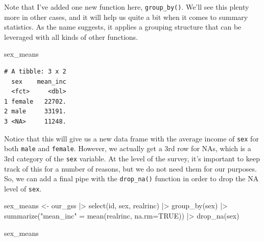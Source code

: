 \documentclass[
  letterpaper,
  DIV=11,
  numbers=noendperiod]{scrreprt}
\newenvironment{Shaded}{\begin{snugshade}}{\end{snugshade}}
\newcommand{\AttributeTok}[1]{\textcolor[rgb]{0.40,0.45,0.13}{#1}}
\newcommand{\ConstantTok}[1]{\textcolor[rgb]{0.56,0.35,0.01}{#1}}
\newcommand{\FunctionTok}[1]{\textcolor[rgb]{0.28,0.35,0.67}{#1}}
\newcommand{\NormalTok}[1]{\textcolor[rgb]{0.00,0.23,0.31}{#1}}
\newcommand{\OtherTok}[1]{\textcolor[rgb]{0.00,0.23,0.31}{#1}}
\newcommand{\SpecialCharTok}[1]{\textcolor[rgb]{0.37,0.37,0.37}{#1}}
\newcommand{\StringTok}[1]{\textcolor[rgb]{0.13,0.47,0.30}{#1}}
\begin{document}
\begin{tcolorbox}[enhanced jigsaw, toprule=.15mm, breakable, rightrule=.15mm, colback=white, colframe=quarto-callout-note-color-frame, colbacktitle=quarto-callout-note-color!10!white, titlerule=0mm, left=2mm, title=\textcolor{quarto-callout-note-color}{\faInfo}\hspace{0.5em}{Note}, bottomrule=.15mm, leftrule=.75mm, opacityback=0, bottomtitle=1mm, arc=.35mm, toptitle=1mm, coltitle=black, opacitybacktitle=0.6]

Note that I've added one new function here, \texttt{group\_by()}. We'll
see this plenty more in other cases, and it will help us quite a bit
when it comes to summary statistics. As the name suggests, it applies a
grouping structure that can be leveraged with all kinds of other
functions.

\end{tcolorbox}

\begin{Shaded}
\begin{Highlighting}[]
\NormalTok{sex\_means}
\end{Highlighting}
\end{Shaded}

\begin{verbatim}
# A tibble: 3 x 2
  sex    mean_inc
  <fct>     <dbl>
1 female   22702.
2 male     33191.
3 <NA>     11248.
\end{verbatim}

Notice that this will give us a new data frame with the average income
of \texttt{sex} for both \texttt{male} and \texttt{female}. However, we
actually get a 3rd row for NAs, which is a 3rd category of the
\texttt{sex} variable. At the level of the survey, it's important to
keep track of this for a number of reasons, but we do not need them for
our purposes. So, we can add a final pipe with the \texttt{drop\_na()}
function in order to drop the NA level of \texttt{sex}.

\begin{Shaded}
\begin{Highlighting}[]
\NormalTok{sex\_means }\OtherTok{\textless{}{-}}\NormalTok{ our\_gss }\SpecialCharTok{|\textgreater{}}
  \FunctionTok{select}\NormalTok{(id, sex, realrinc) }\SpecialCharTok{|\textgreater{}}
  \FunctionTok{group\_by}\NormalTok{(sex) }\SpecialCharTok{|\textgreater{}}
  \FunctionTok{summarize}\NormalTok{(}\StringTok{"mean\_inc"} \OtherTok{=} \FunctionTok{mean}\NormalTok{(realrinc, }\AttributeTok{na.rm=}\ConstantTok{TRUE}\NormalTok{)) }\SpecialCharTok{|\textgreater{}}
  \FunctionTok{drop\_na}\NormalTok{(sex)}

\NormalTok{sex\_means}
\end{Highlighting}
\end{Shaded}
\end{document}
